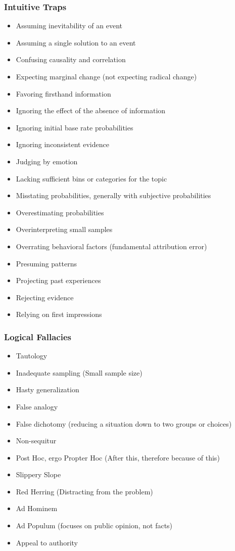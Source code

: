 \documentclass[11pt]{article}
\begin{document}
\subsubsection{Intuitive Traps}
\label{sec:org614b127}
\begin{itemize}
\item Assuming inevitability of an event
\item Assuming a single solution to an event
\item Confusing causality and correlation
\item Expecting marginal change (not expecting radical change)
\item Favoring firsthand information
\item Ignoring the effect of the absence of information
\item Ignoring initial base rate probabilities
\item Ignoring inconsistent evidence
\item Judging by emotion
\item Lacking sufficient bins or categories for the topic
\item Misstating probabilities, generally with subjective probabilities
\item Overestimating probabilities
\item Overinterpreting small samples
\item Overrating behavioral factors (fundamental attribution error)
\item Presuming patterns
\item Projecting past experiences
\item Rejecting evidence
\item Relying on first impressions
\end{itemize}
\subsubsection{Logical Fallacies}
\label{sec:org4efe9f9}
\begin{itemize}
\item Tautology
\item Inadequate sampling (Small sample size)
\item Hasty generalization
\item False analogy
\item False dichotomy  (reducing a situation down to two groups or choices)
\item Non-sequitur
\item Post Hoc, ergo Propter Hoc (After this, therefore because of this)
\item Slippery Slope
\item Red Herring (Distracting from the problem)
\item Ad Hominem
\item Ad Populum (focuses on public opinion, not facts)
\item Appeal to authority
\end{itemize}
\end{document}
